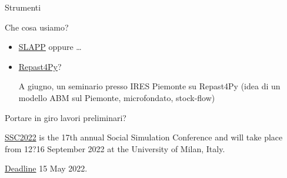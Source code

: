 \documentclass[]{beamer}
\begin{document}
\begin{frame}{Strumenti}

Che cosa usiamo?

\begin{itemize}

\item
\href{https://terna.github.io/SLAPP/}{SLAPP} oppure \ldots

\item
\href{https://repast.github.io/repast4py.site/index.html}{Repast4Py}?

A giugno, un seminario presso IRES Piemonte su Repast4Py (idea di un modello ABM sul Piemonte, microfondato, stock-flow)

\end{itemize}

Portare in giro lavori preliminari?

\href{https://ssc2022.behavelab.org}{SSC2022} is the 17th annual Social Simulation Conference and will take place from 12?16 September 2022 at the University of Milan, Italy.

\href{https://ssc2022.behavelab.org/submissions/}{Deadline} 15 May 2022.

\end{frame}
\end{document}
